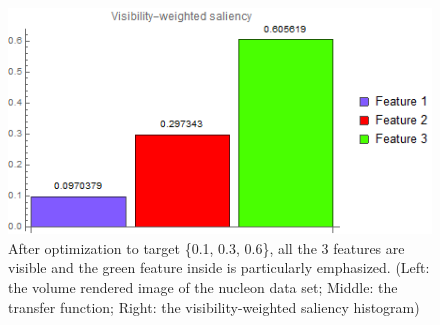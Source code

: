 \begin{figure}
\begin{minipage}{.2\textwidth}
	\end{minipage}~
	\begin{minipage}{.4\textwidth}
		\includegraphics[width=1\linewidth]{images/nucleon_strong_red_optimized_fixed_visibility_saliency_weighted_chart}
	\end{minipage}
	\caption{After optimization to target \{0.1, 0.3, 0.6\}, all the 3 features are visible and the green feature inside is particularly emphasized. (Left: the volume rendered image of the nucleon data set; Middle: the transfer function; Right: the visibility-weighted saliency histogram)}
	\label{fig:nucleon_strong_red_optimized_fixed}
\end{figure}

